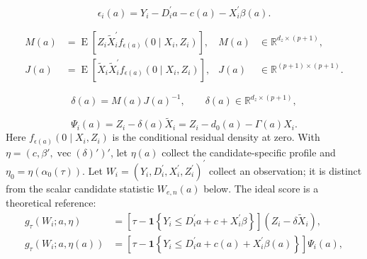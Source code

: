\begin{equation}
    \epsilon_i(a)
    =Y_i-D_i^{\prime}a-c(a)-X_i^{\prime}\beta(a).
    \label{eq:profile-residual}
\end{equation}

\begin{equation}
    \begin{aligned}
        M(a)
        &=\operatorname{E}\!\left[
            Z_i\widetilde X_i^{\prime}f_{\epsilon(a)}(0\mid X_i,Z_i)
        \right],
        & M(a)&\in\mathbb{R}^{d_z\times(p+1)},\\
        J(a)
        &=\operatorname{E}\!\left[
            \widetilde X_i\widetilde X_i^{\prime}f_{\epsilon(a)}(0\mid X_i,Z_i)
        \right],
        & J(a)&\in\mathbb{R}^{(p+1)\times(p+1)}.
    \end{aligned}
    \label{eq:profile-MJ}
\end{equation}

\begin{equation}
    \delta(a)=M(a)J(a)^{-1},
    \qquad
    \delta(a)\in\mathbb{R}^{d_z\times(p+1)},
    \label{eq:profile-delta}
\end{equation}

\begin{equation}
    \Psi_i(a)
    =Z_i-\delta(a)\widetilde X_i
    =Z_i-d_0(a)-\Gamma(a)X_i.
    \label{eq:profile-residualized-instrument}
\end{equation}
Here $f_{\epsilon(a)}(0\mid X_i,Z_i)$ is the conditional residual density at zero. With $\eta=(c,\beta',\operatorname{vec}(\delta)')'$, let $\eta(a)$ collect the candidate-specific profile and $\eta_0=\eta(\alpha_0(\tau))$. Let $W_i=(Y_i,D_i^{\prime},X_i^{\prime},Z_i^{\prime})^{\prime}$ collect an observation; it is distinct from the scalar candidate statistic $W_{e,n}(a)$ below. The ideal score is a theoretical reference:
\begin{equation}
    \begin{aligned}
        g_{\tau}(W_i;a,\eta)
        &=
        \left[
            \tau-\mathbf{1}\!\left\{
                Y_i\leq D_i^{\prime}a+c+X_i^{\prime}\beta
            \right\}
        \right]
        \left(Z_i-\delta\widetilde X_i\right),\\
        g_{\tau}(W_i;a,\eta(a))
        &=
        \left[
            \tau-\mathbf{1}\!\left\{
                Y_i\leq D_i^{\prime}a+c(a)+X_i^{\prime}\beta(a)
            \right\}
        \right]\Psi_i(a),
    \end{aligned}
    \label{eq:orthogonal-score}
\end{equation}


